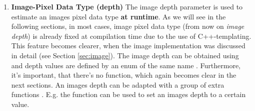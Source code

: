 \begin{enumerate}
\item \textbf{Image-Pixel Data Type (depth)}
The image depth parameter is used to estimate an images pixel data type \textbf{at runtime}. As we will see in the following sections, in most cases, image pixel data type (from now on \emph{image depth}) is already fixed at compilation time due to the use of C++-templating. This feature becomes clearer, when the image implementation was discussed in detail (see Section \ref{sec:image}). The image depth can be obtained using  and depth values are defined by an enum of the same name . Furthermore, it's important, that there's no  function, which again becomes clear in the next sections. An images depth can be adapted with a group of extra functions . E.g. the function   can be used to set an images depth to a certain value. 

\end{enumerate}






